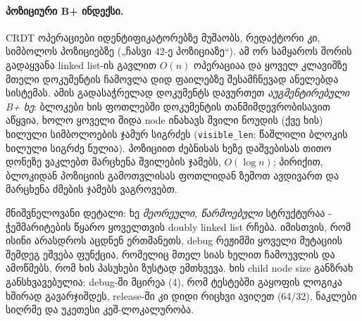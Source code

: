 \paragraph{პოზიციური B+ ინდექსი.}
CRDT ოპერაციები იდენტიფიკატორებზე მუშაობს, რედაქტორი კი, სიმბოლოს
პოზიციებზე („ჩასვი 42-ე პოზიციაზე“). ამ ორ სამყაროს შორის გადაყვანა
linked list-ის გავლით $O(n)$ ოპერაციაა და ყოველ კლავიშზე მთელი
დოკუმენტის ჩამოვლა დიდ ფაილებზე შესამჩნევად ანელებდა სისტემას. ამის
გადასაჭრელად დოკუმენტს დავურთეთ \emph{აუგმენტირებული B+ ხე}: ბლოკები ხის
ფოთლებში დოკუმენტის თანმიმდევრობისავით აწყვია, ხოლო ყოველი შიდა node
ინახავს შვილი ნოუდის (ქვე ხის) ხილული სიმბოლოების ჯამურ სიგრძეს (\texttt{visible\_len};
წაშლილი ბლოკის ხილული სიგრძე ნულია). პოზიციით ძებნისას ხეზე დაშვებისას
თითო დონეზე ვაკლებთ მარცხენა შვილების ჯამებს, $O(\log n)$; პირიქით,
ბლოკიდან პოზიციის გამოთვლისას ფოთლიდან ზემოთ ავდივართ და მარცხენა ძმების
ჯამებს ვაგროვებთ.

მნიშვნელოვანი დეტალი: ხე \emph{მეორეული, წარმოებული} სტრუქტურაა -
ჭეშმარიტების წყარო ყოველთვის doubly linked list რჩება. იმისთვის, რომ ისინი
არასდროს აცდნენ ერთმანეთს, debug რეჟიმში ყოველი მუტაციის შემდეგ ეშვება
ფუნქცია, რომელიც მთელ სიას ხელით ჩამოუვლის და ამოწმებს, რომ ხის პასუხები
ზუსტად ემთხვევა. 
ხის child node size განზრახ განსხვავებულია: debug-ში მცირეა (4),
რომ ტესტებში გაყოფის ლოგიკა ხშირად გავარჯიშდეს, release-ში კი დიდი რიცხვი ავიღეთ
(64/32), ნაკლები სიღრმე და უკეთესი კეშ-ლოკალურობა.

